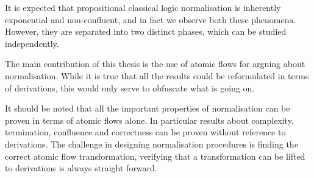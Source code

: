 It is expected that propositional classical logic normalisation is inherently exponential and non-confluent, and in fact we observe both these phenomena. However, they are separated into two distinct phases, which can be studied independently.

The main contribution of this thesis is the use of atomic flows for arguing about normalisation. While it is true that all the results could be reformulated in terms of derivations, this would only serve to obfuscate what is going on.

It should be noted that all the important properties of normalisation can be proven in terms of atomic flows alone. In particular results about complexity, termination, confluence and correctness can be proven without reference to derivations. The challenge in designing normalisation procedures is finding the correct atomic flow transformation, verifying that a transformation can be lifted to derivations is always straight forward.


